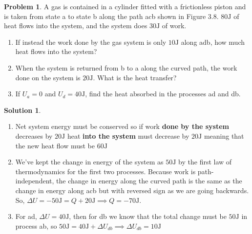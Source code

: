 \documentclass[10pt]{article}
\theoremstyle{definition}
\newtheorem{problem}{Problem}
\newtheorem{soln}{Solution}
\begin{document}
\begin{problem}
A gas is contained in a cylinder fitted with a frictionless piston and is taken from state a to state b along the path acb shown in Figure 3.8.
$80\unit{\joule}$ of heat flows into the system, and the system does $30\unit{\joule}$ of work.
\begin{enumerate}[label=(\alph*)]
  \item If instead the work done by the gas system is only $10\unit{\joule}$ along adb, how much heat flows into the system?
  \item When the system is returned from b to a along the curved path, the work done on the system is $20\unit{\joule}$. What is the heat transfer?
  \item If $U_a = 0$ and $U_d = 40\unit{\joule}$, find the heat absorbed in the processes ad and db.
\end{enumerate}
\end{problem}
\begin{soln}~
  \begin{enumerate}[label=(\alph*)]
    \item Net system energy must be conserved so if work \textbf{done by the system} decreases by $20\unit{\joule}$ heat \textbf{into the system} must decrease by $20\unit{\joule}$ meaning that the new heat flow must be $60\unit{\joule}$
    \item We've kept the change in energy of the system as $50\unit{\joule}$ by the first law of thermodynamics for the first two processes. Because work is path-independent, the change in energy along
          the curved path is the same as the change in energy along acb but with reversed sign as we are going backwards. So, $\Delta U=-50\unit{\joule}=Q+20\unit{\joule}\implies Q=-70\unit{\joule}$.
    \item For ad, $\Delta U =40\unit{\joule}$, then for db we know that the total change must be $50\unit{\joule}$ in process ab, so $50\unit{\joule}=40\unit{\joule}+\Delta U_{db}\implies \Delta U_{db}=10\unit{\joule}$
  \end{enumerate}
\end{soln}
\end{document}
